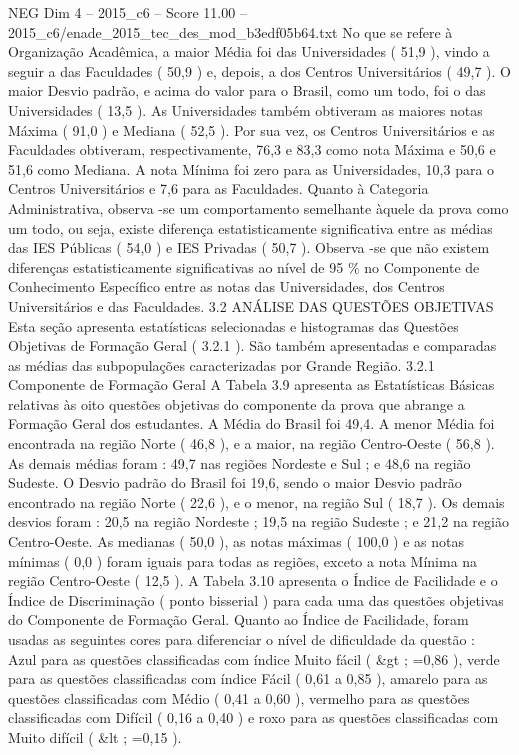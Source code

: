 \begin{textsample}{NEG Dim 4 – 2015\_c6 – Score 11.00 – 2015\_c6/enade\_2015\_tec\_des\_mod\_b3edf05b64.txt}
No que se refere à Organização Acadêmica, a maior Média foi das Universidades ( 51,9 ), vindo a seguir a das Faculdades ( 50,9 ) e, depois, a dos Centros Universitários ( 49,7 ).
O maior Desvio padrão, e acima do valor para o Brasil, como um todo, foi o das Universidades ( 13,5 ).
As Universidades também obtiveram as maiores notas Máxima ( 91,0 ) e Mediana ( 52,5 ).
Por sua vez, os Centros Universitários e as Faculdades obtiveram, respectivamente, 76,3 e 83,3 como nota Máxima e 50,6 e 51,6 como Mediana.
A nota Mínima foi zero para as Universidades, 10,3 para o Centros Universitários e 7,6 para as Faculdades.
Quanto à Categoria Administrativa, observa -se um comportamento semelhante àquele da prova como um todo, ou seja, existe diferença estatisticamente significativa entre as médias das IES Públicas ( 54,0 ) e IES Privadas ( 50,7 ).
Observa -se que não existem diferenças estatisticamente significativas ao nível de 95 \% no Componente de Conhecimento Específico entre as notas das Universidades, dos Centros Universitários e das Faculdades. 3.2 ANÁLISE DAS QUESTÕES OBJETIVAS Esta seção apresenta estatísticas selecionadas e histogramas das Questões Objetivas de Formação Geral ( 3.2.1 ).
São também apresentadas e comparadas as médias das subpopulações caracterizadas por Grande Região. 3.2.1 Componente de Formação Geral A Tabela 3.9 apresenta as Estatísticas Básicas relativas às oito questões objetivas do componente da prova que abrange a Formação Geral dos estudantes.
A Média do Brasil foi 49,4.
A menor Média foi encontrada na região Norte ( 46,8 ), e a maior, na região Centro-Oeste ( 56,8 ).
As demais médias foram : 49,7 nas regiões Nordeste e Sul ; e 48,6 na região Sudeste.
O Desvio padrão do Brasil foi 19,6, sendo o maior Desvio padrão encontrado na região Norte ( 22,6 ), e o menor, na região Sul ( 18,7 ).
Os demais desvios foram : 20,5 na região Nordeste ; 19,5 na região Sudeste ; e 21,2 na região Centro-Oeste.
As medianas ( 50,0 ), as notas máximas ( 100,0 ) e as notas mínimas ( 0,0 ) foram iguais para todas as regiões, exceto a nota Mínima na região Centro-Oeste ( 12,5 ).
A Tabela 3.10 apresenta o Índice de Facilidade e o Índice de Discriminação ( ponto bisserial ) para cada uma das questões objetivas do Componente de Formação Geral.
Quanto ao Índice de Facilidade, foram usadas as seguintes cores para diferenciar o nível de dificuldade da questão :  Azul para as questões classificadas com índice Muito fácil ( \&gt ; =0,86 ), verde para as questões classificadas com índice Fácil ( 0,61 a 0,85 ), amarelo para as questões classificadas com Médio ( 0,41 a 0,60 ), vermelho para as questões classificadas com Difícil ( 0,16 a 0,40 ) e roxo para as questões classificadas com Muito difícil ( \&lt ; =0,15 ).

\end{textsample}
